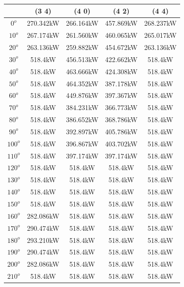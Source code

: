         \begin{table}[H]
        	\centering
        	\begin{tabular}{|c|c|c|c|c|} \hline
        			& (3 4)		& (4 0)		& (4 2)		& (4 4)		\\ \hline
        		$0^o$	& 270.342kW	& 266.164kW	& 457.869kW	& 268.237kW	\\ \hline
        		$10^o$	& 267.174kW	& 261.560kW	& 460.065kW	& 265.017kW	\\ \hline
        		$20^o$	& 263.136kW	& 259.882kW	& 454.672kW	& 263.136kW	\\ \hline
        		$30^o$	& 518.4kW	& 456.513kW	& 422.662kW	& 518.4kW	\\ \hline
        		$40^o$	& 518.4kW	& 463.666kW	& 424.308kW	& 518.4kW	\\ \hline
        		$50^o$	& 518.4kW	& 464.352kW	& 387.178kW	& 518.4kW	\\ \hline
        		$60^o$	& 518.4kW	& 449.876kW	& 397.367kW	& 518.4kW	\\ \hline
        		$70^o$	& 518.4kW	& 384.231kW	& 366.773kW	& 518.4kW	\\ \hline
        		$80^o$	& 518.4kW	& 386.652kW	& 368.786kW	& 518.4kW	\\ \hline
        		$90^o$	& 518.4kW	& 392.897kW	& 405.786kW	& 518.4kW	\\ \hline
        		$100^o$	& 518.4kW	& 396.867kW	& 403.702kW	& 518.4kW	\\ \hline
        		$110^o$	& 518.4kW	& 397.174kW	& 397.174kW	& 518.4kW	\\ \hline
        		$120^o$	& 518.4kW	& 518.4kW	& 518.4kW	& 518.4kW	\\ \hline
        		$130^o$	& 518.4kW	& 518.4kW	& 518.4kW	& 518.4kW	\\ \hline
        		$140^o$	& 518.4kW	& 518.4kW	& 518.4kW	& 518.4kW	\\ \hline
        		$150^o$	& 518.4kW	& 518.4kW	& 518.4kW	& 518.4kW	\\ \hline
        		$160^o$	& 282.086kW	& 518.4kW	& 518.4kW	& 518.4kW	\\ \hline
        		$170^o$	& 290.474kW	& 518.4kW	& 518.4kW	& 518.4kW	\\ \hline
        		$180^o$	& 293.210kW	& 518.4kW	& 518.4kW	& 518.4kW	\\ \hline
        		$190^o$	& 290.474kW	& 518.4kW	& 518.4kW	& 518.4kW	\\ \hline
        		$200^o$	& 282.086kW	& 518.4kW	& 518.4kW	& 518.4kW	\\ \hline
        		$210^o$	& 518.4kW	& 518.4kW	& 518.4kW	& 518.4kW	\\ \hline

\end{tabular}
\end{table}
